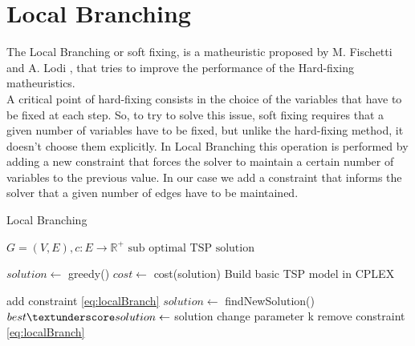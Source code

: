 \section{Local Branching}

The Local Branching or soft fixing, is a matheuristic proposed by M. Fischetti and A. Lodi \cite{fischetti2003local}, that tries to improve the performance of the Hard-fixing matheuristics.\\
A critical point of hard-fixing consists in the choice of the variables that have to be fixed at each step. So, to try to solve this issue, soft fixing requires that a given number of variables have to be fixed, but unlike the hard-fixing method, it doesn’t choose them explicitly. In Local Branching this operation is performed by adding a new constraint that forces the solver to maintain a certain number of variables to the previous value. In our case we add a constraint that informs the solver that a given number of edges have to be maintained. \\

\begin{algorithm}[h!]
    \caption{Local Branching}\label{algo:SoftFixing}
    \begin{algorithmic}[1]
    \Require $G = (V,E), c:E \to \mathbb{R}^+$
    \Ensure $\text{sub optimal TSP solution}$

    \State $solution \gets$ greedy()
    \State $cost \gets $ cost(solution)
    \State Build basic TSP model in CPLEX



    \State add constraint \ref{eq:localBranch}
    \State $solution \gets$ findNewSolution()
    \State $ best\textunderscore solution \gets$ solution
    \State change parameter k
    \EndIf
    \State remove constraint \ref{eq:localBranch}
    \EndWhile

    \end{algorithmic}
\end{algorithm}

